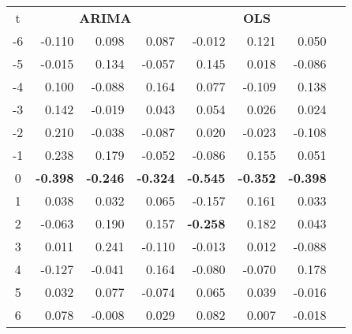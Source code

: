 \documentclass[10pt,a4paper]{scrreprt}
\begin{document}
\begin{table}[htbp]
\begin{tabular}{crrr|rrrr}
    \midrule
    t     & \multicolumn{3}{c|}{\textbf{ARIMA}} & \multicolumn{3}{c}{\textbf{OLS}} &  \\
    -6    & -0.110 & 0.098 & 0.087 & -0.012 & 0.121 & 0.050 &  \\
    -5    & -0.015 & 0.134 & -0.057 & 0.145 & 0.018 & -0.086 &  \\
    -4    & 0.100 & -0.088 & 0.164 & 0.077 & -0.109 & 0.138 &  \\
    -3    & 0.142 & -0.019 & 0.043 & 0.054 & 0.026 & 0.024 &  \\
    -2    & 0.210 & -0.038 & -0.087 & 0.020 & -0.023 & -0.108 &  \\
    -1    & 0.238 & 0.179 & -0.052 & -0.086 & 0.155 & 0.051 &  \\
    0     & \textbf{-0.398} & \textbf{-0.246} & \textbf{-0.324} & \textbf{-0.545} & \textbf{-0.352} & \textbf{-0.398} &  \\
    1     & 0.038 & 0.032 & 0.065 & -0.157 & 0.161 & 0.033 &  \\
    2     & -0.063 & 0.190 & 0.157 & \textbf{-0.258} & 0.182 & 0.043 &  \\
    3     & 0.011 & 0.241 & -0.110 & -0.013 & 0.012 & -0.088 &  \\
    4     & -0.127 & -0.041 & 0.164 & -0.080 & -0.070 & 0.178 &  \\
    5     & 0.032 & 0.077 & -0.074 & 0.065 & 0.039 & -0.016 &  \\
    6     & 0.078 & -0.008 & 0.029 & 0.082 & 0.007 & -0.018 &  \\
    \bottomrule
    \bottomrule
    \end{tabular}%
  \label{tab:ccf_fss2}%
\end{table}%


\end{document}
